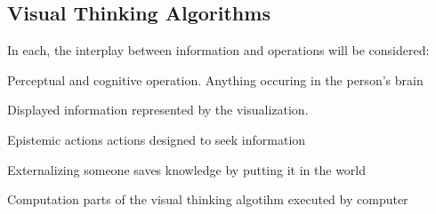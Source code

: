 \begin{mdframed}\begin{multicols}{2}
\subsection{Visual Thinking Algorithms}



In each, the interplay between information and operations will be considered:
\begin{compactdesc}
\item[Perceptual and cognitive] operation. Anything occuring in the person's
    brain
\item[Displayed information] represented by the visualization.
\item[Epistemic actions] actions designed to seek information
\item[Externalizing] someone saves knowledge by putting it in the world
\item[Computation] parts of the visual thinking algotihm executed by computer
\end{compactdesc}
\end{multicols}\end{mdframed}





